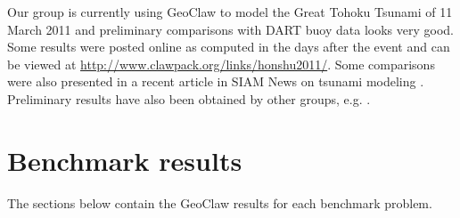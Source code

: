 Our group is currently using GeoClaw to model the Great Tohoku Tsunami of 11
March 2011 and preliminary comparisons with DART buoy data looks very good.
Some results were posted online as computed in the days after the event and
can be viewed at
\url{http://www.clawpack.org/links/honshu2011/}.
Some comparisons were also presented in a recent article in SIAM News on tsunami
modeling \cite{siamnews-tsunami}.  Preliminary results have also been
obtained by other groups, e.g. \cite{ZhangYuenEtal:2011}.


\section{Benchmark results}

The sections below contain the GeoClaw results for each benchmark problem.

